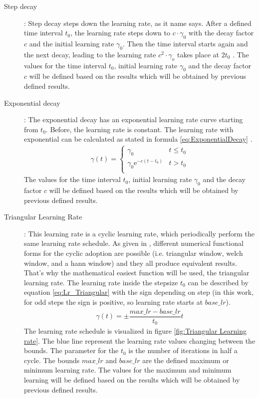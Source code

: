 \documentclass[12pt,DIV14,BCOR12mm,a4paper,footexclude,headinclude,halfparskip-,twoside,openright,openany,cleardoubleempty,idxtotoc,bibtotoc]{scrreprt} %
\numberwithin{equation}{chapter}
\begin{document}
\begin{description}
	\begin{description}
		\item[Step decay]: Step decay steps down the learning rate, as it name says. After a defined time interval $t_0$, the learning rate steps down to $c\cdot\gamma_0$ with the decay factor $c$ and the initial learning rate $\gamma_0$. Then the time interval starts again and the next decay, leading to the learning rate $c^2\cdot\gamma_o$ takes place at $2t_0$ \cite{LectureNotes_DeepLearning}. The values for the time interval $t_0$, initial learning rate $\gamma_0$ and the decay factor $c$ will be defined based on the results which will be obtained by previous defined results.
		\item[Exponential decay]: The exponential decay has an exponential learning rate curve starting from $t_0$. Before, the learning rate is constant. The learning rate with exponential can be calculated as stated in formula \ref{eq:ExponentialDecay} \cite{LectureNotes_DeepLearning}.
		\begin{align}
			\gamma(t) = \begin{cases} \gamma_0 & t \leq t_0\\\gamma_0\textrm{e}^{-c(t-t_0)} & t > t_0\\ \end{cases}\label{eq:ExponentialDecay}
		\end{align}
		The values for the time interval $t_0$, initial learning rate $\gamma_0$ and the decay factor $c$ will be defined based on the results which will be obtained by previous defined results.
		\item[Triangular Learning Rate]: This learning rate is a cyclic learning rate, which periodically perform the same learning rate schedule. As given in \cite{Smith15CyclicLearningRate}, different numerical functional forms for the cyclic adoption are possible (i.e. triangular window, welch window, and a hann window) and they all produce equivalent results. That's why the mathematical easiest function will be used, the triangular learning rate. The learning rate inside the stepsize $t_0$ can be described by equation \ref{eq:Lr_Triangular} with the sign depending on step (in this work, for odd steps the sign is positive, so learning rate starts at $base\_lr$).
		\begin{align}
			\gamma(t) = \pm\dfrac{max\_lr-base\_lr}{t_0}t\label{eq:Lr_Triangular}
		\end{align}		
		The learning rate schedule is visualized in figure \ref{fig:Triangular Learning rate}. The blue line represent the learning rate values changing between the bounds. The parameter for the $t_0$ is the number of iterations in half a cycle. The bounds $max\_lr$ and $base\_lr$ are the defined maximum or minimum learning rate. The values for the maximum and minimum learning will be defined based on the results which will be obtained by previous defined results.

\end{description}
\end{description}
\end{document}
